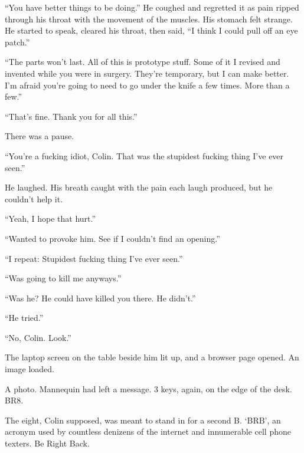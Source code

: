 ``You have better things to be doing.''  He coughed and regretted it as pain ripped through his throat with the movement of the muscles.  His stomach felt strange.  He started to speak, cleared his throat, then said,  ``I think I could pull off an eye patch.''



``The parts won't last.  All of this is prototype stuff.  Some of it I revised and invented while you were in surgery.  They're temporary, but I can make better.  I'm afraid you're going to need to go under the knife a few times.  More than a few.''



``That's fine.  Thank you for all this.''



There was a pause.



``You're a fucking idiot, Colin.  That was the stupidest fucking thing I've ever seen.''



He laughed.  His breath caught with the pain each laugh produced, but he couldn't help it.



``Yeah, I hope that hurt.''



``Wanted to provoke him.  See if I couldn't find an opening.''



``I repeat: Stupidest fucking thing I've ever seen.''



``Was going to kill me anyways.''



``Was he?  He could have killed you there.  He didn't.''



``He tried.''



``No, Colin.  Look.''



The laptop screen on the table beside him lit up, and a browser page opened.  An image loaded.



A photo.  Mannequin had left a message.  3 keys, again, on the edge of the desk.  BR8.



The eight, Colin supposed, was meant to stand in for a second B.  `BRB', an acronym used by countless denizens of the internet and innumerable cell phone texters.  Be Right Back.




